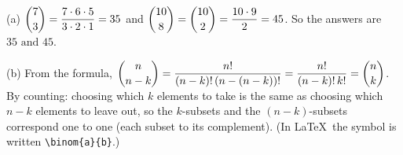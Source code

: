 (a) $\dbinom73=\dfrac{7\cdot6\cdot5}{3\cdot2\cdot1}=35$ and $\dbinom{10}8=\dbinom{10}{2}=\dfrac{10\cdot9}{2}=45$. So the answers are $\boxed{35\text{ and }45}$.

(b) From the formula, $\dbinom n{n-k}=\dfrac{n!}{(n-k)!\,(n-(n-k))!}=\dfrac{n!}{(n-k)!\,k!}=\dbinom nk$. By counting: choosing which $k$ elements to take is the same as choosing which $n-k$ elements to leave out, so the $k$-subsets and the $(n-k)$-subsets correspond one to one (each subset to its complement). (In \LaTeX\ the symbol is written \verb|\binom{a}{b}|.)
